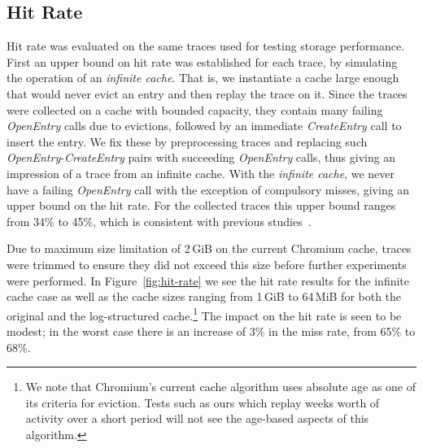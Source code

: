 \documentclass[letterpaper,twocolumn,10pt]{article}
\begin{document}
\subsection{Hit Rate}

Hit rate was evaluated on the same traces used for testing storage
performance. First an upper bound on hit rate was established for each trace, by
simulating the operation of an \emph{infinite cache}.  That is, we instantiate a
cache large enough that would never evict an entry and then replay the trace on
it.  Since the traces were collected on a cache with bounded capacity, they
contain many failing \emph{OpenEntry} calls due to evictions, followed by an
immediate \emph{CreateEntry} call to insert the entry.  We fix these by
preprocessing traces and replacing such \emph{OpenEntry}-\emph{CreateEntry}
pairs with succeeding \emph{OpenEntry} calls, thus giving an impression of a
trace from an infinite cache.  With the \emph{infinite cache}, we never have a
failing \emph{OpenEntry} call with the exception of compulsory misses, giving an
upper bound on the hit rate.  For the collected traces this upper bound ranges
from 34\% to 45\%, which is consistent with previous studies~\cite{souders12}.

Due to maximum size limitation of 2\,GiB on the current Chromium cache, traces
were trimmed to ensure they did not exceed this size before further experiments
were performed.  In Figure~\ref{fig:hit-rate} we see the hit rate results for
the infinite cache case as well as the cache sizes ranging from 1\,GiB to
64\,MiB for both the original and the log-structured cache.\footnote{We note
  that Chromium's current cache algorithm uses absolute age as one of its
  criteria for eviction. Tests such as ours which replay weeks worth of activity
  over a short period will not see the age-based aspects of this algorithm.}
The impact on the hit rate is seen to be modest; in the worst case there is an
increase of 3\% in the miss rate, from 65\% to 68\%.
\end{document}
